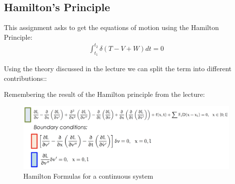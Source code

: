 \subsection{Hamilton's Principle}
This assignment asks to get the equations of motion using the Hamilton Principle:
\begin{equation}
    \begin{split}
        \int_{t_1}^{t_2}\delta(T-V+W)dt = 0
    \end{split}
\end{equation}

Using the theory discussed in the lecture we can split the term into different contributions::


Remembering the result of the Hamilton principle from the lecture:

\begin{figure}[ht]
    \centering
    \includegraphics[scale=0.2]{images/Hamilton.png}
    \caption{Hamilton Formulas for a continuous system}
    \label{fig:hamilton}
\end{figure}

